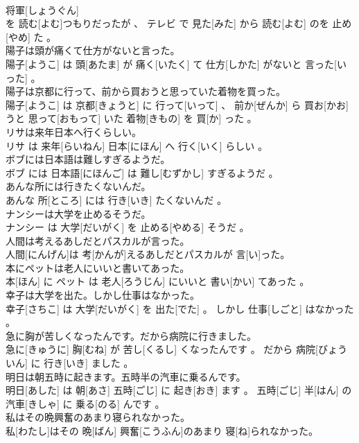 \documentclass[8pt]{extreport}
\begin{document}
\begin{CJK}{UTF8}{min}
\\	将軍[しょうぐん] 
\\	を 読む[よむ]つもりだったが 、 テレビ で 見た[みた] から 読む[よむ] のを 止め[やめ] た 。
\\	陽子は頭が痛くて仕方がないと言った。	
\\	陽子[ようこ] は 頭[あたま] が 痛く[いたく] て 仕方[しかた] がないと 言った[いった] 。
\\	陽子は京都に行って、前から買おうと思っていた着物を買った。	
\\	陽子[ようこ] は 京都[きょうと] に 行って[いって] 、 前か[ぜんか] ら 買お[かお] うと 思って[おもって] いた 着物[きもの] を 買[か] った 。
\\	リサは来年日本へ行くらしい。	
\\	リサ は 来年[らいねん] 日本[にほん] へ 行く[いく] らしい 。
\\	ボブには日本語は難しすぎるようだ。	
\\	ボブ には 日本語[にほんご] は 難し[むずかし] すぎるようだ 。
\\	あんな所には行きたくないんだ。	
\\	あんな 所[ところ] には 行き[いき] たくないんだ 。
\\	ナンシーは大学を止めるそうだ。	
\\	ナンシー は 大学[だいがく] を 止める[やめる] そうだ 。
\\	人間は考えるあしだとパスカルが言った。	
\\	人間[にんげん]は 考[かんが]えるあしだとパスカルが 言[い]った。
\\	本にペットは老人にいいと書いてあった。	
\\	本[ほん] に ペット は 老人[ろうじん] にいいと 書い[かい] てあった 。
\\	幸子は大学を出た。しかし仕事はなかった。	
\\	幸子[さちこ] は 大学[だいがく] を 出た[でた] 。 しかし 仕事[しごと] はなかった 。
\\	急に胸が苦しくなったんです。だから病院に行きました。	
\\	急に[きゅうに] 胸[むね] が 苦し[くるし] くなったんです 。 だから 病院[びょういん] に 行き[いき] ました 。
\\	明日は朝五時に起きます。五時半の汽車に乗るんです。	
\\	明日[あした] は 朝[あさ] 五時[ごじ] に 起き[おき] ます 。 五時[ごじ] 半[はん] の 汽車[きしゃ] に 乗る[のる] んです 。
\\	私はその晩興奮のあまり寝られなかった。	
\\	私[わたし]はその 晩[ばん] 興奮[こうふん]のあまり 寝[ね]られなかった。

\end{CJK}
\end{document}
